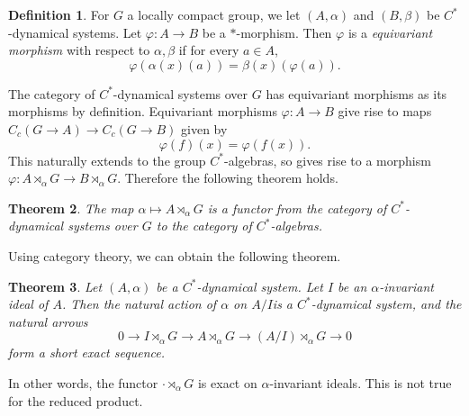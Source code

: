\documentclass[12pt]{report}
\newcommand{\dfn}[1]{\emph{#1}\index{#1}}
\newtheorem{theorem}{Theorem}[chapter]
\theoremstyle{definition}
\newtheorem{definition}[theorem]{Definition}
\begin{document}
\begin{definition}
    For $G$ a locally compact group, we let $(A, \alpha)$ and $(B, \beta)$ be $C^*$-dynamical systems. Let $\varphi: A \to B$ be a $*$-morphism. Then $\varphi$ is a \dfn{equivariant morphism} with respect to $\alpha,\beta$ if for every $a \in A$,
    $$\varphi(\alpha(x)(a)) = \beta(x)(\varphi(a)).$$
\end{definition}
    The category of $C^*$-dynamical systems over $G$ has equivariant morphisms as its morphisms by definition. Equivariant morphisms $\varphi:A \to B$ give rise to maps $C_c(G \to A) \to C_c(G \to B)$ given by
    $$\varphi(f)(x) = \varphi(f(x)).$$
    This naturally extends to the group $C^*$-algebras, so gives rise to a morphism $\varphi: A \rtimes_\alpha G \to B \rtimes_\alpha G$. Therefore the following theorem holds.
\begin{theorem}
    The map $\alpha \mapsto A \rtimes_\alpha G$ is a functor from the category of $C^*$-dynamical systems over $G$ to the category of $C^*$-algebras.
\end{theorem}
    Using category theory, we can obtain the following theorem.
\begin{theorem}
    Let $(A, \alpha)$ be a $C^*$-dynamical system. Let $I$ be an $\alpha$-invariant ideal of $A$. Then the natural action of $\alpha$ on $A/I$is a $C^*$-dynamical system, and the natural arrows
    $$0 \to I \rtimes_\alpha G \to A \rtimes_\alpha G \to (A/I) \rtimes_\alpha G \to 0$$
    form a short exact sequence.
\end{theorem}
    In other words, the functor $\cdot \rtimes_\alpha G$ is exact on $\alpha$-invariant ideals. This is not true for the reduced product.
\end{document}
